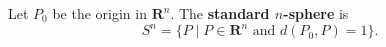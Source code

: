 Let $P_0$ be the origin in $\mathbf{R}^n$. The \textbf{standard $n$-sphere} is
$$S^n = \{ P \mid P \in \mathbf{R}^n \text{ and } d(P_0, P) = 1 \}.$$
